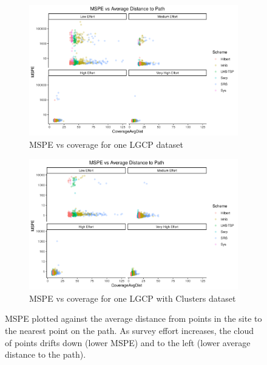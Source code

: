 \documentclass[review]{elsarticle}
\begin{document}
\begin{figure}

\begin{subfigure}{4.5in}
\includegraphics[width=4.5in]{../graphics/MSPE-Coverage-LGCP000004.png}
\caption{MSPE vs coverage for one LGCP dataset}
\label{covglgcp}
\end{subfigure}

\begin{subfigure}{4.5in}
\includegraphics[width=4.5in]{../graphics/MSPE-Coverage-Cluster000004.png}
\caption{MSPE vs coverage for one LGCP with Clusters dataset}
\label{covgclust}
\end{subfigure}

\caption{MSPE plotted against the average distance from points in the site to
the nearest point on the path. As survey effort increases, the cloud of points
drifts down (lower MSPE) and to the left (lower average distance to the path).}
\label{covg}
\end{figure}

\end{document}
